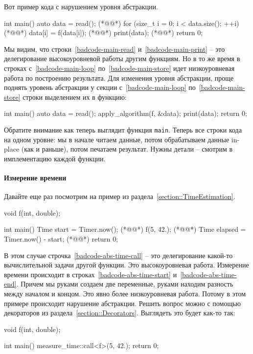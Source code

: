 Вот пример кода с нарушением уровня абстракции.
\begin{cppcode}
int main() {
  auto data = read(); (*@@*)
  for (size_t i = 0; i < data.size(); ++i) (*@@*)
    data[i] = f(data[i]); (*@@*)
  print(data); (*@@*)
  return 0;
}
\end{cppcode}
Мы видим, что строки~\ref{badcode-main-read} и~\ref{badcode-main-print} -- это делегирование высокоуровневой работы другим функциям.
Но в то же время в строках с~\ref{badcode-main-loop} по~\ref{badcode-main-store} идет низкоуровневая работа по построению результата.
Для изменения уровня абстракции, проще поднять уровень абстракции у секции с~\ref{badcode-main-loop} по~\ref{badcode-main-store} строки выделением их в функцию:
\begin{cppcode}
int main() {
  auto data = read();
  apply_algorithm(f, &data);
  print(data);
  return 0;
}
\end{cppcode}
Обратите внимание как теперь выглядит функция \verb"main".
Теперь все строки кода на одном уровне: мы в начале читаем данные, потом обрабатываем данные in-place (как и раньше), потом печатаем результат.
Нужны детали -- смотрим в имплементацию каждой функции.

\paragraph{Измерение времени}

Давайте еще раз посмотрим на пример из раздела~\ref{section::TimeEstimation}.
\begin{cppcode}
void f(int, double);

int main() {
  Time start = Timer.now(); (*@@*)
  f(5, 42.); (*@@*)
  Time elapsed = Timer.now() - start; (*@@*)
  return 0;
}
\end{cppcode}
В этом случае строчка~\ref{badcode-abs-time-call} -- это делегирование какой-то вычислительной задачи другой функции.
Это высокоуровневая работа.
Измерение времени происходит в строках~\ref{badcode-abs-time-start} и~\ref{badcode-abs-time-end}.
Причем мы руками создаем две переменные, руками находим разность между началом и концом.
Это явно более низкоуровневая работа.
Потому в этом примере происходит нарушение абстракции.
Решить вопрос можно с помощью декораторов из раздела~\ref{section::Decorators}.
Выглядеть это будет как-то так:
\begin{cppcode}
void f(int, double);

int main() {
  measure_time::call<f>(5, 42.);
  return 0;
}
\end{cppcode}


